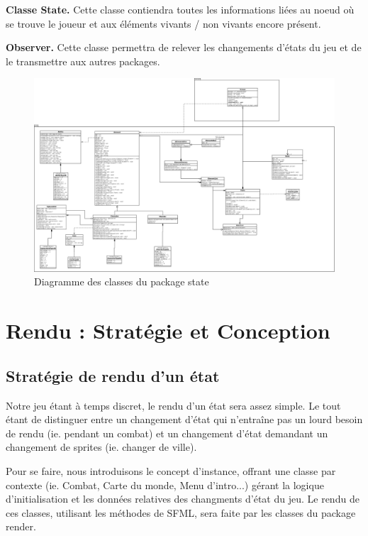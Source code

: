\documentclass[12pt,a4paper]{report}
\begin{document}
\textbf{Classe State.} Cette classe contiendra toutes les informations li\'{e}es au noeud o\`{u} se trouve le joueur et aux \'{e}l\'{e}ments vivants / non vivants encore pr\'{e}sent.

\textbf{Observer.} Cette classe permettra de relever les changements d'\'{e}tats du jeu et de le transmettre aux autres packages.

\begin{figure}
\caption{Diagramme des classes du package state}
\includegraphics[width=1.25\textwidth]{state.jpeg}
\end{figure}

\chapter{Rendu : Strat\'{e}gie et Conception}
\section{Strat\'{e}gie de rendu d'un état}
Notre jeu \'{e}tant à temps discret, le rendu d'un \'{e}tat sera assez simple. Le tout étant de distinguer entre un changement d'\'{e}tat qui n'entra\^{i}ne pas un lourd besoin de rendu (ie. pendant un combat) et un changement d'\'{e}tat demandant un changement de sprites (ie. changer de ville).

Pour se faire, nous introduisons le concept d'instance, offrant une classe par contexte (ie. Combat, Carte du monde, Menu d'intro...) g\'{e}rant la logique d'initialisation et les donn\'{e}es relatives des changments d'\'{e}tat du jeu. Le rendu de ces classes, utilisant les m\'{e}thodes de SFML, sera faite par les classes du package render.
\end{document}
